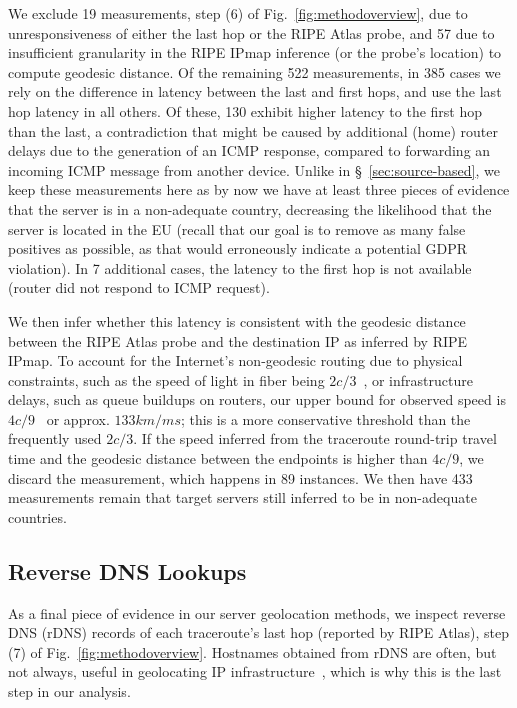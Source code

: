 We exclude 19 measurements, step (6) of Fig.~\ref{fig:methodoverview}, due to unresponsiveness of either the last hop or the 
RIPE Atlas probe, and 57 due to insufficient
granularity in the RIPE IPmap inference (or the probe's location) to compute geodesic distance. 
Of the remaining 522 measurements, in 385 cases we rely on the difference in latency between 
the last and first hops, and use the last hop latency in all others. Of these,
130 exhibit higher latency to the first hop than the last, a contradiction that 
might be caused by additional (home) router delays due to the generation of an ICMP response,
compared to forwarding an incoming ICMP message from another device. Unlike in
\S~\ref{sec:source-based}, we keep these measurements here as by now we have
at least three pieces of evidence that the server is in a non-adequate country,
decreasing the likelihood that the server is located in the EU (recall that our goal
is to remove as many false positives as possible, as that would erroneously indicate a potential GDPR violation).
In 7 additional cases, the
latency to the first hop is not available (router did not respond to ICMP request).

We then infer whether this latency is consistent with the geodesic distance between 
the RIPE Atlas probe and the destination IP as inferred by RIPE IPmap. 
To account for the Internet's non-geodesic routing due to 
physical constraints, such as the speed of light in fiber being $2c/3$~\cite{10.1145/3402413.3402415}, 
or infrastructure delays, such as queue buildups on routers, our
upper bound for observed speed is $4c/9$~\cite{10.1145/1177080.1177090} or approx. $133 km/ms$; 
this is a more conservative 
threshold than the frequently used $2c/3$. 
If the speed inferred from the 
traceroute round-trip travel time and the geodesic distance between the endpoints 
is higher than $4c/9$, we discard the measurement,
which happens in 89 instances. We then have 433 measurements remain that target servers 
still inferred to be in non-adequate countries.

\subsection{Reverse DNS Lookups}

As a final piece of evidence in our server geolocation methods, we inspect
reverse DNS (rDNS) records of each traceroute's last hop
(reported by RIPE Atlas), step (7) of Fig.~\ref{fig:methodoverview}. Hostnames obtained from rDNS are often, 
but not always, useful in geolocating IP infrastructure~\cite{geodns}, 
which is why this is the last step in our analysis. 

